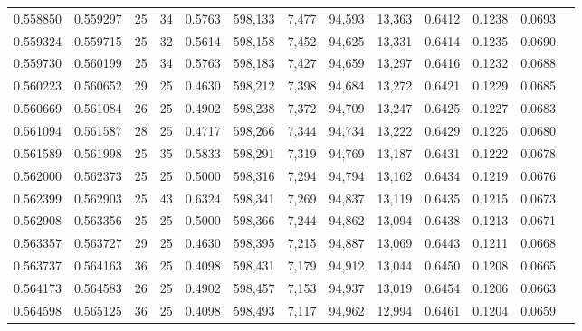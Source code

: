 \begin{tabular}{rrrrrrrrrrrrr}
0.558850 & 0.559297 &    25 &  34 &                                     0.5763 & 598,133 &   7,477 &  94,593 &  13,363 & 0.6412 & 0.1238 & 0.0693 \\
0.559324 & 0.559715 &    25 &  32 &                                     0.5614 & 598,158 &   7,452 &  94,625 &  13,331 & 0.6414 & 0.1235 & 0.0690 \\
0.559730 & 0.560199 &    25 &  34 &                                     0.5763 & 598,183 &   7,427 &  94,659 &  13,297 & 0.6416 & 0.1232 & 0.0688 \\
0.560223 & 0.560652 &    29 &  25 &                                     0.4630 & 598,212 &   7,398 &  94,684 &  13,272 & 0.6421 & 0.1229 & 0.0685 \\
0.560669 & 0.561084 &    26 &  25 &                                     0.4902 & 598,238 &   7,372 &  94,709 &  13,247 & 0.6425 & 0.1227 & 0.0683 \\
0.561094 & 0.561587 &    28 &  25 &                                     0.4717 & 598,266 &   7,344 &  94,734 &  13,222 & 0.6429 & 0.1225 & 0.0680 \\
0.561589 & 0.561998 &    25 &  35 &                                     0.5833 & 598,291 &   7,319 &  94,769 &  13,187 & 0.6431 & 0.1222 & 0.0678 \\
0.562000 & 0.562373 &    25 &  25 &                                     0.5000 & 598,316 &   7,294 &  94,794 &  13,162 & 0.6434 & 0.1219 & 0.0676 \\
0.562399 & 0.562903 &    25 &  43 &                                     0.6324 & 598,341 &   7,269 &  94,837 &  13,119 & 0.6435 & 0.1215 & 0.0673 \\
0.562908 & 0.563356 &    25 &  25 &                                     0.5000 & 598,366 &   7,244 &  94,862 &  13,094 & 0.6438 & 0.1213 & 0.0671 \\
0.563357 & 0.563727 &    29 &  25 &                                     0.4630 & 598,395 &   7,215 &  94,887 &  13,069 & 0.6443 & 0.1211 & 0.0668 \\
0.563737 & 0.564163 &    36 &  25 &                                     0.4098 & 598,431 &   7,179 &  94,912 &  13,044 & 0.6450 & 0.1208 & 0.0665 \\
0.564173 & 0.564583 &    26 &  25 &                                     0.4902 & 598,457 &   7,153 &  94,937 &  13,019 & 0.6454 & 0.1206 & 0.0663 \\
0.564598 & 0.565125 &    36 &  25 &                                     0.4098 & 598,493 &   7,117 &  94,962 &  12,994 & 0.6461 & 0.1204 & 0.0659 \\

\end{tabular}
